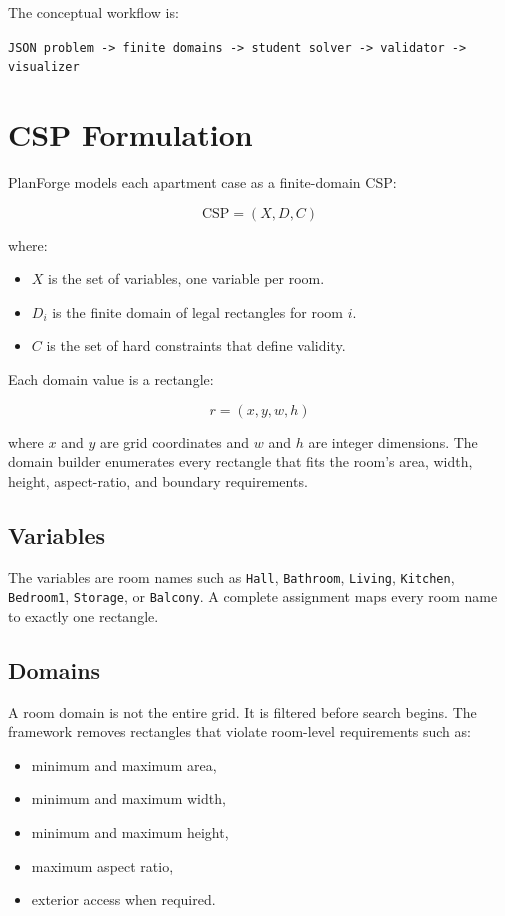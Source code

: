 \documentclass[11pt]{article}
\begin{document}
The conceptual workflow is:

\begin{center}
\texttt{JSON problem -> finite domains -> student solver -> validator -> visualizer}
\end{center}

\section{CSP Formulation}

PlanForge models each apartment case as a finite-domain CSP:

\[
  \text{CSP} = (X, D, C)
\]

where:

\begin{itemize}[leftmargin=*]
  \item $X$ is the set of variables, one variable per room.
  \item $D_i$ is the finite domain of legal rectangles for room $i$.
  \item $C$ is the set of hard constraints that define validity.
\end{itemize}

Each domain value is a rectangle:

\[
  r = (x, y, w, h)
\]

where $x$ and $y$ are grid coordinates and $w$ and $h$ are integer dimensions. The domain
builder enumerates every rectangle that fits the room's area, width, height, aspect-ratio, and
boundary requirements.

\subsection{Variables}

The variables are room names such as \texttt{Hall}, \texttt{Bathroom}, \texttt{Living},
\texttt{Kitchen}, \texttt{Bedroom1}, \texttt{Storage}, or \texttt{Balcony}. A complete assignment
maps every room name to exactly one rectangle.

\subsection{Domains}

A room domain is not the entire grid. It is filtered before search begins. The framework removes
rectangles that violate room-level requirements such as:

\begin{itemize}[leftmargin=*]
  \item minimum and maximum area,
  \item minimum and maximum width,
  \item minimum and maximum height,
  \item maximum aspect ratio,
  \item exterior access when required.
\end{itemize}
\end{document}
